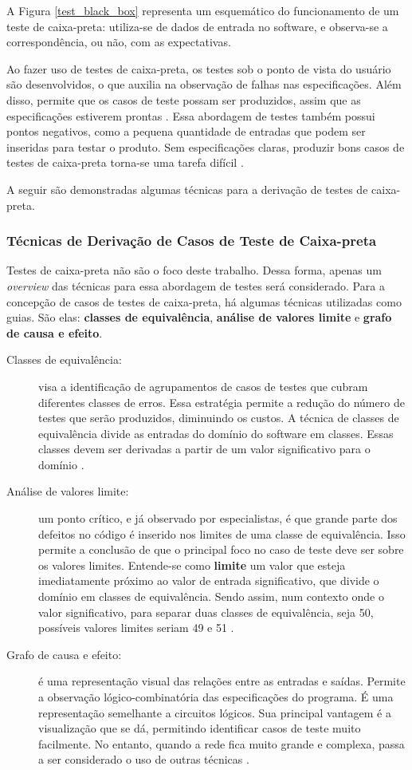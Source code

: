 A Figura \ref{test_black_box} representa um esquemático do funcionamento de um
teste de caixa-preta: utiliza-se de dados de entrada no software, e observa-se a
correspondência, ou não, com as expectativas.
\par
\indent Ao fazer uso de testes de caixa-preta, os testes sob o ponto de vista
do usuário são desenvolvidos, o que auxilia na observação de falhas nas
especificações. Além disso, permite que os casos de teste possam ser produzidos,
assim que as especificações estiverem prontas \cite{stf2010}. Essa abordagem de
testes também possui pontos negativos, como a pequena quantidade de entradas
que podem ser inseridas para testar o produto. Sem especificações claras,
produzir bons casos de testes de caixa-preta torna-se uma tarefa difícil
\cite{stf2010}.
\par
\indent A seguir são demonstradas algumas técnicas para a derivação de testes
de caixa-preta.

\subsubsection{Técnicas de Derivação de Casos de Teste de Caixa-preta}
Testes de caixa-preta não são o foco deste trabalho. Dessa forma, apenas um
\textit{overview} das técnicas para essa abordagem de testes será considerado.
Para a concepção de casos de testes de caixa-preta, há algumas técnicas
utilizadas como guias. São elas: \textbf{classes de equivalência},
\textbf{análise de valores limite} e \textbf{grafo de causa e efeito}.

\begin{description}
\item[Classes de equivalência:] visa a identificação de agrupamentos de casos
de testes que cubram diferentes classes de erros. Essa estratégia permite a
redução do número de testes que serão produzidos, diminuindo os custos. A
técnica de classes de equivalência divide as entradas do domínio do software em
classes. Essas classes devem ser derivadas a partir de um valor significativo
para o domínio \cite{williams2006}.
\item[Análise de valores limite:] um ponto crítico, e já observado por
especialistas, é que grande parte dos defeitos no código é inserido nos
limites de uma classe de equivalência. Isso permite a conclusão de que o
principal foco no caso de teste deve ser sobre os valores limites. Entende-se
como \textbf{limite} um valor que esteja imediatamente próximo ao valor de
entrada significativo, que divide o domínio em classes de equivalência. Sendo
assim, num contexto onde o valor significativo, para separar duas classes de
equivalência, seja 50, possíveis valores limites seriam 49 e 51
\cite{williams2006}.
\item[Grafo de causa e efeito:] é uma representação visual das relações entre
as entradas e saídas. Permite a observação lógico-combinatória das
especificações do programa. É uma representação semelhante a circuitos lógicos.
Sua principal vantagem é a visualização que se dá, permitindo identificar casos
de teste muito facilmente. No entanto, quando a rede fica muito grande e
complexa, passa a ser considerado o uso de outras técnicas
\cite{barbosaEtAl2009}.
\end{description}


